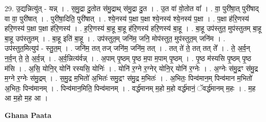 \documentclass[17pt]{extarticle}
\begin{document}
29. उ॒द्यन्नित्यु॑त् - यन्न् । . स॒मु॒द्रा दु॒तोत स॑मु॒द्राथ् स॑मु॒द्रा दु॒त । . उ॒त वा॑ वो॒तोत वा᳚ । . वा॒ पुरी॑षा॒त् पुरी॑षाद् वा वा॒ पुरी॑षात् । . पुरी॑षा॒दिति॒ पुरी॑षात् । . श्ये॒नस्य॑ प॒क्षा प॒क्षा श्ये॒नस्य॑ श्ये॒नस्य॑ प॒क्षा । . प॒क्षा ह॑रि॒णस्य॑ हरि॒णस्य॑ प॒क्षा प॒क्षा ह॑रि॒णस्य॑ । . ह॒रि॒णस्य॑ बा॒हू बा॒हू ह॑रि॒णस्य॑ हरि॒णस्य॑ बा॒हू । . बा॒हू उप॑स्तुत॒ मुप॑स्तुतम् बा॒हू बा॒हू उप॑स्तुतम् । . बा॒हू इति॑ बा॒हू । . उप॑स्तुत॒म् जनि॑म॒ जनि॒ मोप॑स्तुत॒ मुप॑स्तुत॒म् जनि॑म । . उप॑स्तुत॒मित्युप॑ - स्तु॒त॒म् । . जनि॑म॒ तत् तज् जनि॑म॒ जनि॑म॒ तत् । . तत् ते॑ ते॒ तत् तत् ते᳚ । . ते॒ अ॒र्व॒न् न॒र्व॒न् ते॒ ते॒ अ॒र्व॒न्न् । . अ॒र्व॒न्नित्य॑र्वन्न् । . अ॒पाम् पृ॒ष्ठम् पृ॒ष्ठ म॒पा म॒पाम् पृ॒ष्ठम् । . पृ॒ष्ठ म॑स्यसि पृ॒ष्ठम् पृ॒ष्ठ म॑सि । . अ॒सि॒ योनि॒र् योनि॑ रस्यसि॒ योनिः॑ । . योनि॑ र॒ग्ने र॒ग्नेर् योनि॒र् योनि॑ र॒ग्नेः । . अ॒ग्नेः स॑मु॒द्रꣳ स॑मु॒द्र म॒ग्ने र॒ग्नेः स॑मु॒द्रम् । . स॒मु॒द्र म॒भितो॑ अ॒भितः॑ समु॒द्रꣳ स॑मु॒द्र म॒भितः॑ । . अ॒भितः॒ पिन्व॑मान॒म् पिन्व॑मान म॒भितो॑ अ॒भितः॒ पिन्व॑मानम् । . पिन्व॑मान॒मिति॒ पिन्व॑मानम् । . वर्द्ध॑मानम् म॒हो म॒हो वर्द्ध॑मानं॒ ॅवर्द्ध॑मानम् म॒हः । . म॒ह आ म॒हो म॒ह आ । \newline

\textbf{Ghana Paata } \newline
\end{document}
